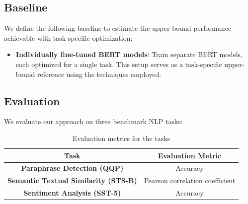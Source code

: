 \subsection{Baseline}

We define the following baseline to estimate the upper-bound performance achievable with task-specific optimization:

\begin{itemize}
    \item \textbf{Individually fine-tuned BERT models}: Train separate BERT models, each optimized for a single task. This setup serves as a task-specific upper-bound reference using the techniques employed.
\end{itemize}





\subsection{Evaluation}
We evaluate our approach on three benchmark NLP tasks:
\begin{table}[H]
    \centering
    \begin{tabular}{|c|c|}
    \hline
    \textbf{Task} & \textbf{Evaluation Metric} \\
    \hline
    \textbf{Paraphrase Detection (QQP)} & Accuracy \\
    \hline
    \textbf{Semantic Textual Similarity (STS-B)} & Pearson correlation coefficient \\
    \hline
    \textbf{Sentiment Analysis (SST-5)} & Accuracy \\
    \hline
    \end{tabular}
    \caption{Evaluation metrics for the tasks}
    \label{tasks_ratings0}
\end{table}